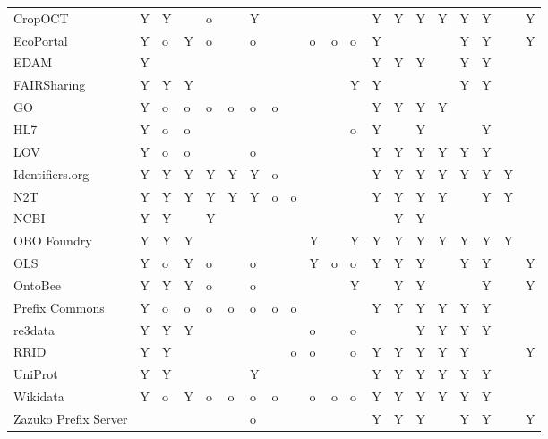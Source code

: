 \begin{table}
\begin{tabular}{llllllllllllllllllll}
CropOCT~\cite{Arnaud2020} & Y & Y &  & o &  & Y &  &  &  &  &  & Y & Y & Y & Y & Y & Y &  & Y \\
EcoPortal~\cite{Kechagioglou2021} & Y & o & Y & o &  & o &  &  & o & o & o & Y &  &  &  & Y & Y &  & Y \\
EDAM~\cite{Ison2013} & Y &  &  &  &  &  &  &  &  &  &  & Y & Y & Y &  & Y & Y &  &  \\
FAIRSharing~\cite{Sansone2019} & Y & Y & Y &  &  &  &  &  &  &  & Y & Y &  &  &  & Y & Y &  &  \\
GO~\cite{TheGeneOntologyConsortium2019} & Y & o & o & o & o & o & o &  &  &  &  & Y & Y & Y & Y &  &  &  &  \\
HL7~\cite{Bender2013} & Y & o & o &  &  &  &  &  &  &  & o & Y &  & Y &  &  & Y &  &  \\
LOV & Y & o & o &  &  & o &  &  &  &  &  & Y & Y & Y & Y & Y & Y &  &  \\
Identifiers.org~\cite{Juty2012} & Y & Y & Y & Y & Y & Y & o &  &  &  &  & Y & Y & Y & Y & Y & Y & Y &  \\
N2T~\cite{Wimalaratne2018} & Y & Y & Y & Y & Y & Y & o & o &  &  &  & Y & Y & Y & Y &  & Y & Y &  \\
NCBI~\cite{Clark2016} & Y & Y &  & Y &  &  &  &  &  &  &  &  & Y & Y &  &  &  &  &  \\
OBO Foundry~\cite{Jackson2021} & Y & Y & Y &  &  &  &  &  & Y &  & Y & Y & Y & Y & Y & Y & Y & Y &  \\
OLS~\cite{Cote2006a} & Y & o & Y & o &  & o &  &  & Y & o & o & Y & Y & Y &  & Y & Y &  & Y \\
OntoBee~\cite{Ong2017} & Y & Y & Y & o &  & o &  &  &  &  & Y &  & Y & Y &  &  & Y &  & Y \\
Prefix Commons~\cite{prefixcommons} & Y & o & o & o & o & o & o & o &  &  &  & Y & Y & Y & Y & Y & Y &  &  \\
re3data~\cite{Pampel2013} & Y & Y & Y &  &  &  &  &  & o &  & o &  &  & Y & Y & Y & Y &  &  \\
RRID & Y & Y &  &  &  &  &  & o & o &  & o & Y & Y & Y & Y & Y &  &  & Y \\
UniProt~\cite{Bateman2021} & Y & Y &  &  &  & Y &  &  &  &  &  & Y & Y & Y & Y & Y & Y &  &  \\
Wikidata~\cite{Waagmeester2020} & Y & o & Y & o & o & o & o &  & o & o & o & Y & Y & Y & Y & Y & Y &  &  \\
Zazuko Prefix Server &  &  &  &  &  & o &  &  &  &  &  & Y & Y & Y &  & Y & Y &  & Y \\
\bottomrule
\end{tabular}
\end{table}

